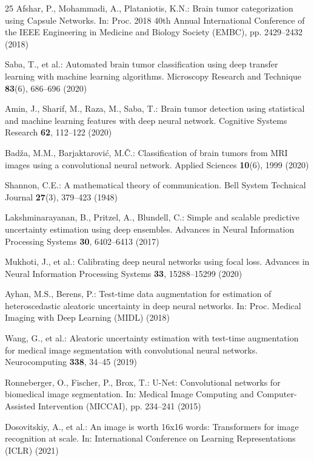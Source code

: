 \documentclass[runningheads]{llncs}
\begin{document}
\begin{thebibliography}{25}
Afshar, P., Mohammadi, A., Plataniotis, K.N.: Brain tumor categorization using Capsule Networks. In: Proc. 2018 40th Annual International Conference of the IEEE Engineering in Medicine and Biology Society (EMBC), pp. 2429--2432 (2018)

Saba, T., et al.: Automated brain tumor classification using deep transfer learning with machine learning algorithms. Microscopy Research and Technique \textbf{83}(6), 686--696 (2020)

Amin, J., Sharif, M., Raza, M., Saba, T.: Brain tumor detection using statistical and machine learning features with deep neural network. Cognitive Systems Research \textbf{62}, 112--122 (2020)

Bad\v{z}a, M.M., Barjaktarovi\'{c}, M.\v{C}.: Classification of brain tumors from MRI images using a convolutional neural network. Applied Sciences \textbf{10}(6), 1999 (2020)

Shannon, C.E.: A mathematical theory of communication. Bell System Technical Journal \textbf{27}(3), 379--423 (1948)

Lakshminarayanan, B., Pritzel, A., Blundell, C.: Simple and scalable predictive uncertainty estimation using deep ensembles. Advances in Neural Information Processing Systems \textbf{30}, 6402--6413 (2017)

Mukhoti, J., et al.: Calibrating deep neural networks using focal loss. Advances in Neural Information Processing Systems \textbf{33}, 15288--15299 (2020)

Ayhan, M.S., Berens, P.: Test-time data augmentation for estimation of heteroscedastic aleatoric uncertainty in deep neural networks. In: Proc. Medical Imaging with Deep Learning (MIDL) (2018)

Wang, G., et al.: Aleatoric uncertainty estimation with test-time augmentation for medical image segmentation with convolutional neural networks. Neurocomputing \textbf{338}, 34--45 (2019)

Ronneberger, O., Fischer, P., Brox, T.: U-Net: Convolutional networks for biomedical image segmentation. In: Medical Image Computing and Computer-Assisted Intervention (MICCAI), pp. 234--241 (2015)

Dosovitskiy, A., et al.: An image is worth 16x16 words: Transformers for image recognition at scale. In: International Conference on Learning Representations (ICLR) (2021)


\end{thebibliography}
\end{document}
